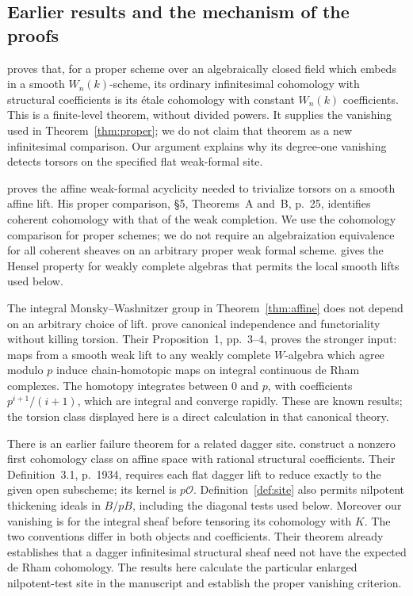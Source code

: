 \documentclass[11pt]{article}
\newcommand{\OO}{\mathcal O}\newcommand{\CC}{\mathcal C}
\theoremstyle{definition}\newtheorem{definition}[theorem]{Definition}
\theoremstyle{remark}\newtheorem{remark}[theorem]{Remark}
\begin{document}
\subsection*{Earlier results and the mechanism of the proofs}

\citet[Corollary~4.7, p.~314]{Ogus} proves that, for a proper scheme over an algebraically closed field which embeds in a smooth $W_n(k)$-scheme, its ordinary infinitesimal cohomology with structural coefficients is its \'etale cohomology with constant $W_n(k)$ coefficients. This is a finite-level theorem, without divided powers. It supplies the vanishing used in Theorem~\ref{thm:proper}; we do not claim that theorem as a new infinitesimal comparison. Our argument explains why its degree-one vanishing detects torsors on the specified flat weak-formal site.

\citet[\S2, Theorem~14, p.~10]{Meredith} proves the affine weak-formal acyclicity needed to trivialize torsors on a smooth affine lift. His proper comparison, \S5, Theorems~A and~B, p.~25, identifies coherent cohomology with that of the weak completion. We use the cohomology comparison for proper schemes; we do not require an algebraization equivalence for all coherent sheaves on an arbitrary proper weak formal scheme. \citet[Proposition~2.31, author version p.~19]{DLZ} gives the Hensel property for weakly complete algebras that permits the local smooth lifts used below.

The integral Monsky--Washnitzer group in Theorem~\ref{thm:affine} does not depend on an arbitrary choice of lift. \citet[Proposition~2 and Lemma~3, author version pp.~4--5]{ErtlSprang} prove canonical independence and functoriality without killing torsion. Their Proposition~1, pp.~3--4, proves the stronger input: maps from a smooth weak lift to any weakly complete $W$-algebra which agree modulo $p$ induce chain-homotopic maps on integral continuous de Rham complexes. The homotopy integrates between $0$ and $p$, with coefficients $p^{i+1}/(i+1)$, which are integral and converge rapidly. These are known results; the torsion class displayed here is a direct calculation in that canonical theory.

There is an earlier failure theorem for a related dagger site. \citet[Theorem~8.6, pp.~1987--1989, and Corollary~8.11, p.~1989]{ArabiaMebkhout} construct a nonzero first cohomology class on affine space with rational structural coefficients. Their Definition~3.1, p.~1934, requires each flat dagger lift to reduce exactly to the given open subscheme; its kernel is $p\OO$. Definition~\ref{def:site} also permits nilpotent thickening ideals in $B/pB$, including the diagonal tests used below. Moreover our vanishing is for the integral sheaf before tensoring its cohomology with $K$. The two conventions differ in both objects and coefficients. Their theorem already establishes that a dagger infinitesimal structural sheaf need not have the expected de Rham cohomology. The results here calculate the particular enlarged nilpotent-test site in the manuscript and establish the proper vanishing criterion.
\end{document}
